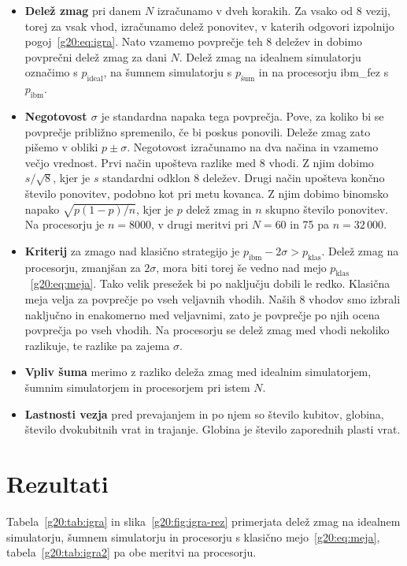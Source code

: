 \begin{itemize}
\item \textbf{Delež zmag} pri danem $N$ izračunamo v dveh korakih. Za vsako od 8 vezij, torej za vsak vhod, izračunamo delež ponovitev, v katerih odgovori izpolnijo pogoj~\eqref{g20:eq:igra}. Nato vzamemo povprečje teh 8 deležev in dobimo povprečni delež zmag za dani $N$. Delež zmag na idealnem simulatorju označimo s $p_\text{ideal}$, na šumnem simulatorju s $p_\text{šum}$ in na procesorju ibm\_fez s $p_\text{ibm}$.
\item \textbf{Negotovost $\sigma$} je standardna napaka tega povprečja. Pove, za koliko bi se povprečje približno spremenilo, če bi poskus ponovili. Deleže zmag zato pišemo v obliki $p\pm\sigma$. Negotovost izračunamo na dva načina in vzamemo večjo vrednost. Prvi način upošteva razlike med 8 vhodi. Z njim dobimo $s/\sqrt{8}$, kjer je $s$ standardni odklon 8 deležev. Drugi način upošteva končno število ponovitev, podobno kot pri metu kovanca. Z njim dobimo binomsko napako $\sqrt{p(1-p)/n}$, kjer je $p$ delež zmag in $n$ skupno število ponovitev. Na procesorju je $n=8000$, v drugi meritvi pri $N=60$ in 75 pa $n=32\,000$.
\item \textbf{Kriterij} za zmago nad klasično strategijo je $p_\text{ibm}-2\sigma>p_\text{klas}$. Delež zmag na procesorju, zmanjšan za $2\sigma$, mora biti torej še vedno nad mejo $p_\text{klas}$~\eqref{g20:eq:meja}. Tako velik presežek bi po naključju dobili le redko. Klasična meja velja za povprečje po vseh veljavnih vhodih. Naših 8 vhodov smo izbrali naključno in enakomerno med veljavnimi, zato je povprečje po njih ocena povprečja po vseh vhodih. Na procesorju se delež zmag med vhodi nekoliko razlikuje, te razlike pa zajema $\sigma$.
\item \textbf{Vpliv šuma} merimo z razliko deleža zmag med idealnim simulatorjem, šumnim simulatorjem in procesorjem pri istem $N$.
\item \textbf{Lastnosti vezja} pred prevajanjem in po njem so število kubitov, globina, število dvokubitnih vrat in trajanje. Globina je število zaporednih plasti vrat.
\end{itemize}


\section{Rezultati}
\label{g20:sec:rezultati}

Tabela~\ref{g20:tab:igra} in slika~\ref{g20:fig:igra-rez} primerjata delež zmag na idealnem simulatorju, šumnem simulatorju in procesorju s klasično mejo~\eqref{g20:eq:meja}, tabela~\ref{g20:tab:igra2} pa obe meritvi na procesorju.


